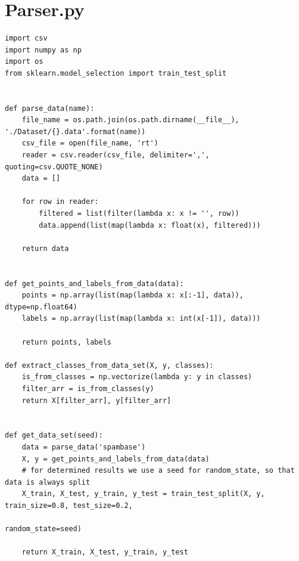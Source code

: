 \section*{Parser.py}

\begin{lstlisting}[style=py]
import csv
import numpy as np
import os
from sklearn.model_selection import train_test_split


def parse_data(name):
    file_name = os.path.join(os.path.dirname(__file__), './Dataset/{}.data'.format(name))
    csv_file = open(file_name, 'rt')
    reader = csv.reader(csv_file, delimiter=',', quoting=csv.QUOTE_NONE)
    data = []

    for row in reader:
        filtered = list(filter(lambda x: x != '', row))
        data.append(list(map(lambda x: float(x), filtered)))

    return data


def get_points_and_labels_from_data(data):
    points = np.array(list(map(lambda x: x[:-1], data)), dtype=np.float64)
    labels = np.array(list(map(lambda x: int(x[-1]), data)))

    return points, labels

def extract_classes_from_data_set(X, y, classes):
    is_from_classes = np.vectorize(lambda y: y in classes)
    filter_arr = is_from_classes(y)
    return X[filter_arr], y[filter_arr]


def get_data_set(seed):
    data = parse_data('spambase')
    X, y = get_points_and_labels_from_data(data)
    # for determined results we use a seed for random_state, so that data is always split
    X_train, X_test, y_train, y_test = train_test_split(X, y, train_size=0.8, test_size=0.2,
                                                        random_state=seed)

    return X_train, X_test, y_train, y_test

\end{lstlisting}


